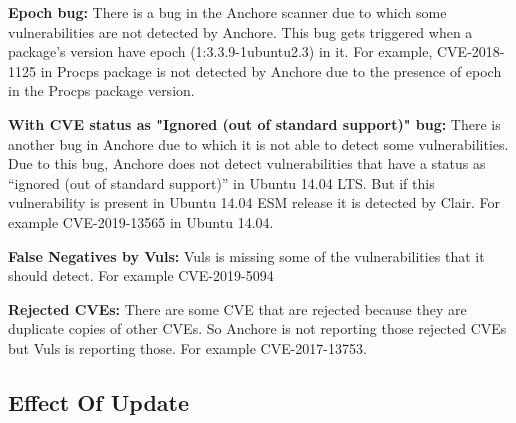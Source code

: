 \documentclass[a4paper,num-refs]{oup-contemporary}
\begin{document}
\textbf{Epoch bug:} There is a bug in the Anchore scanner due to which some vulnerabilities are 
		not detected by Anchore. This bug gets triggered when a package’s version have epoch 
		(1:3.3.9-1ubuntu2.3) in it. For example, CVE-2018-1125 in Procps package is not
		detected by Anchore due to the presence of epoch in the Procps package version.

\textbf{With CVE status as "Ignored (out of standard support)" bug:} There is another bug in Anchore due to 
		which it is not able to detect some vulnerabilities. Due to this bug, Anchore does not detect 
		vulnerabilities that have a status as “ignored (out of standard support)” in Ubuntu 14.04 LTS. 
		But if this vulnerability is present in Ubuntu 14.04 ESM release it is detected by Clair. 
		For example CVE-2019-13565 in Ubuntu 14.04.


\textbf{False Negatives by Vuls:} Vuls is missing some of the vulnerabilities that it should detect. 
		For example CVE-2019-5094

\textbf{Rejected CVEs:} There are some CVE that are rejected because they are duplicate copies of other CVEs. 
	So Anchore is not reporting those rejected CVEs but Vuls is reporting those. For example CVE-2017-13753.

\subsection{Effect Of Update}

\end{document}
